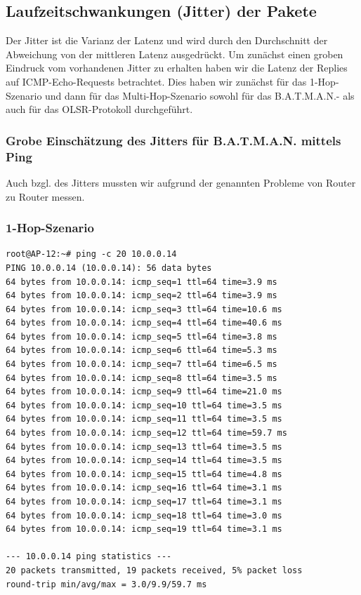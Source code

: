 \documentclass[a4paper,10pt]{article}
\begin{document}
\subsection{Laufzeitschwankungen (Jitter) der Pakete}

Der Jitter ist die Varianz der Latenz und wird durch den Durchschnitt der Abweichung von der mittleren Latenz ausgedrückt.
Um zunächst einen groben Eindruck vom vorhandenen Jitter zu erhalten haben wir die Latenz der Replies auf ICMP-Echo-Requests betrachtet.
Dies haben wir zunächst für das 1-Hop-Szenario und dann für das Multi-Hop-Szenario sowohl für das B.A.T.M.A.N.- als auch für das OLSR-Protokoll durchgeführt.

\subsubsection{Grobe Einschätzung des Jitters für B.A.T.M.A.N. mittels Ping}

Auch bzgl. des Jitters mussten wir aufgrund der genannten Probleme von Router zu Router messen.

\subsubsection*{1-Hop-Szenario}

\begin{lstlisting}
root@AP-12:~# ping -c 20 10.0.0.14
PING 10.0.0.14 (10.0.0.14): 56 data bytes
64 bytes from 10.0.0.14: icmp_seq=1 ttl=64 time=3.9 ms
64 bytes from 10.0.0.14: icmp_seq=2 ttl=64 time=3.9 ms
64 bytes from 10.0.0.14: icmp_seq=3 ttl=64 time=10.6 ms
64 bytes from 10.0.0.14: icmp_seq=4 ttl=64 time=40.6 ms
64 bytes from 10.0.0.14: icmp_seq=5 ttl=64 time=3.8 ms
64 bytes from 10.0.0.14: icmp_seq=6 ttl=64 time=5.3 ms
64 bytes from 10.0.0.14: icmp_seq=7 ttl=64 time=6.5 ms
64 bytes from 10.0.0.14: icmp_seq=8 ttl=64 time=3.5 ms
64 bytes from 10.0.0.14: icmp_seq=9 ttl=64 time=21.0 ms
64 bytes from 10.0.0.14: icmp_seq=10 ttl=64 time=3.5 ms
64 bytes from 10.0.0.14: icmp_seq=11 ttl=64 time=3.5 ms
64 bytes from 10.0.0.14: icmp_seq=12 ttl=64 time=59.7 ms
64 bytes from 10.0.0.14: icmp_seq=13 ttl=64 time=3.5 ms
64 bytes from 10.0.0.14: icmp_seq=14 ttl=64 time=3.5 ms
64 bytes from 10.0.0.14: icmp_seq=15 ttl=64 time=4.8 ms
64 bytes from 10.0.0.14: icmp_seq=16 ttl=64 time=3.1 ms
64 bytes from 10.0.0.14: icmp_seq=17 ttl=64 time=3.1 ms
64 bytes from 10.0.0.14: icmp_seq=18 ttl=64 time=3.0 ms
64 bytes from 10.0.0.14: icmp_seq=19 ttl=64 time=3.1 ms

--- 10.0.0.14 ping statistics --- 
20 packets transmitted, 19 packets received, 5% packet loss
round-trip min/avg/max = 3.0/9.9/59.7 ms
\end{lstlisting}
\end{document}
